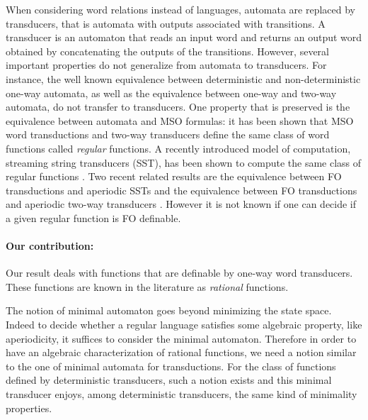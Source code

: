 \documentclass[12pt]{report}
\theoremstyle{definition}
\theoremstyle{remark}
\begin{document}
When considering word relations instead of languages, automata are replaced by transducers, that is automata with outputs associated with transitions. A transducer is an automaton that reads an input word and returns an output word obtained by concatenating the outputs of the transitions. However, several important properties do not generalize from automata to transducers. For instance, the well known equivalence between deterministic and non-deterministic one-way automata, as well as the equivalence between one-way and two-way automata, do not transfer to transducers. One property that is preserved is the equivalence between automata and MSO formulas: it has been shown \cite{engelfrieth01} that MSO word transductions and two-way transducers define the same class of word functions called \emph{regular} functions. A recently introduced model of computation, streaming string transducers (SST), has been shown to compute the same class of regular functions \cite{alurc10}.
Two recent related results are the equivalence between FO transductions and aperiodic SSTs \cite{filiotkt14} and the equivalence between FO transductions and aperiodic two-way transducers \cite{cartond15}. However it is not known if one can decide if a given regular function is FO definable.

\paragraph*{Our contribution:}
Our result deals with functions that are definable by one-way word transducers.
These functions are known in the literature as \emph{rational} functions.

The notion of minimal automaton goes beyond minimizing the state space.
Indeed to decide whether a regular language satisfies some algebraic property, like aperiodicity, it suffices to consider the minimal automaton.
Therefore in order to have an algebraic characterization of rational functions, we need a notion similar to the one of minimal automata for transductions.
For the class of functions defined by deterministic transducers, such a notion exists \cite{choffrut03} and this minimal transducer enjoys, among deterministic transducers, the same kind of minimality properties.
\end{document}
